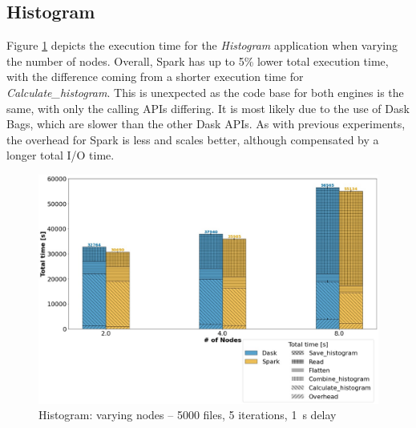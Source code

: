 \documentclass[conference]{IEEEtran}
\begin{document}
\subsection{Histogram}
Figure \ref{fig:histogram_worker} depicts the execution time for the \textit{Histogram} application when varying the number of nodes.
Overall, Spark has up to 5\% lower total execution time, with the difference coming from a shorter execution time for \textit{Calculate\_histogram}.
This is unexpected as the code base for both engines is the same, with only the calling APIs differing.
It is most likely due to the use of Dask Bags, which are slower than the other Dask APIs.
As with previous experiments, the overhead for Spark is less and scales better, although compensated by a longer total I/O time.
\begin{figure}[!t]
	\centering
	\includegraphics[clip,width=\columnwidth]{figures/stacked_histogram_worker.jpg}
	\caption{Histogram: varying nodes -- 5000 files, 5 iterations, \SI{1}{\second} delay}
	\label{fig:histogram_worker}
\end{figure}
		
\end{document}
